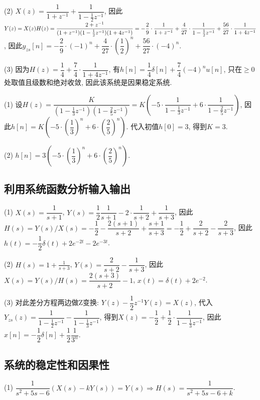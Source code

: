 (2) $X(z)=\dfrac{1}{1+z^{-1}}+\dfrac{1}{1-\frac{1}{2}z^{-1}}$, 因此$Y(z)=X(z)H(z)=\dfrac{2+z^{-1}}{(1+z^{-1})(1-\frac{1}{2}z^{-1})(1+4z^{-1})}\\=-\dfrac{2}{9}\cdot\dfrac{1}{1+z^{-1}}+\dfrac{4}{27}\cdot\dfrac{1}{1-\frac{1}{2}z^{-1}}+\dfrac{56}{27}\cdot\dfrac{1}{1+4z^{-1}}$, 因此$y_{zs}[n]=-\dfrac{2}{9}\cdot(-1)^n+\dfrac{4}{27}\cdot\left(\dfrac{1}{2}\right)^n+\dfrac{56}{27}\cdot(-4)^n$.

(3) 因为$H(z)=\dfrac{1}{4}+\dfrac{7}{4}\cdot\dfrac{1}{1+4z^{-1}}$, 有$h[n]=\dfrac{1}{4}\delta[n]+\dfrac{7}{4}(-4)^nu[n]$, 只在$\ge0$处取值且级数和绝对收敛, 因此该系统是因果稳定系统.


(1) 设$H(z)=\dfrac{K}{(1-\frac{1}{3}z^{-1})(1-\frac{2}{5}z^{-1})}=K\left(-5\cdot\dfrac{1}{1-\frac{1}{3}z^{-1}}+6\cdot\dfrac{1}{1-\frac{2}{5}z^{-1}}\right)$, 因此$h[n]=K\left(-5\cdot\left(\dfrac{1}{3}\right)^n+6\cdot\left(\dfrac{2}{5}\right)^n\right)$. 代入初值$h[0]=3$, 得到$K=3$.

(2) $h[n]=3\left(-5\cdot\left(\dfrac{1}{3}\right)^n+6\cdot\left(\dfrac{2}{5}\right)^n\right)$.

\subsection{利用系统函数分析输入输出}

(1) $X(s)=\dfrac{1}{s+1}$, $Y(s)=\dfrac{1}{2}\dfrac{1}{s+1}-2\cdot\dfrac{1}{s+2}+\dfrac{1}{s+3}$, 因此$H(s)=Y(s)/X(s)=-\dfrac{1}{2}-\dfrac{2(s+1)}{s+2}+\dfrac{s+1}{s+3}=-\dfrac{1}{2}+\dfrac{2}{s+2}-\dfrac{2}{s+3}$, 因此$h(t)=-\dfrac{1}{2}\delta(t)+2e^{-2t}-2e^{-3t}$.

(2) $H(s)=1+\frac{1}{s+3}$, $Y(s)=\dfrac{2}{s+2}-\dfrac{1}{s+3}$, 因此$X(s)=Y(s)/H(s)=\dfrac{2(s+3)}{s+2}-1$, $x(t)=\delta(t)+2e^{-2}$.

(3) 对此差分方程两边做Z变换: $Y(z)-\dfrac{1}{2}z^{-1}Y(z)=X(z)$, 代入$Y_{zs}(z)=\dfrac{1}{1-\frac{1}{2}z^{-1}}-\dfrac{1}{1-\frac{1}{3}z^{-1}}$, 得到$X(z)=-\dfrac{1}{2}+\dfrac{1}{2}\cdot\dfrac{1}{1-\frac{1}{3}z^{-1}}$, 因此$x[n]=-\dfrac{1}{2}\delta[n]+\dfrac{1}{2}\dfrac{1}{3^n}$.

\subsection{系统的稳定性和因果性}


(1) $\dfrac{1}{s^2+5s-6}(X(s)-kY(s))=Y(s)\Rightarrow H(s)=\dfrac{1}{s^2+5s-6+k}$.

